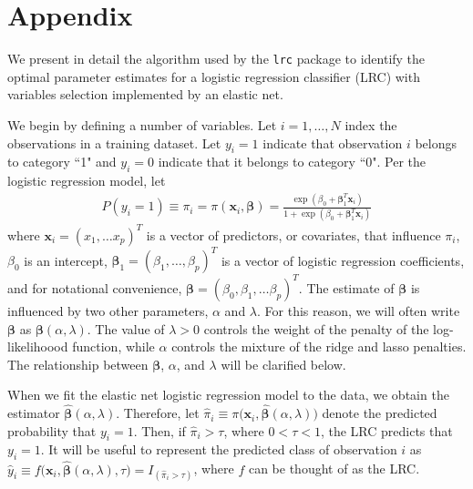 \documentclass{article}
\begin{document}
\nocite{*}

  

\newpage

\section*{Appendix}
We present in detail the algorithm used by the {\tt lrc} package to identify the optimal parameter estimates
for a logistic regression classifier (LRC) with variables selection implemented by an elastic net.  

We begin by defining a
number of variables.  Let $i = 1,\ldots,N$ index the observations in a training dataset. 
Let $y_i = 1$ indicate that observation $i$ belongs to category ``1" and $y_i = 0$ indicate
that it belongs to category ``0".  Per the logistic regression model, let  
\begin{align}
P(y_i = 1) \equiv \pi_i = \pi(\mathbf{x}_i, \boldsymbol{\beta}) = 
\frac{\exp(\beta_0 + \boldsymbol{\beta}_1^T \mathbf{x}_i)}{1+\exp(\beta_0 + \boldsymbol{\beta}_1^T \mathbf{x}_i)}
\end{align}
\noindent where $\mathbf{x}_i = (x_1, \ldots x_p)^T$ is a vector of predictors, or covariates, that
influence $\pi_i$, $\beta_0$ is an intercept, $\boldsymbol{\beta}_1 = (\beta_1, \ldots, \beta_p)^T$ is a 
vector of  logistic regression coefficients, and for notational convenience, 
$\boldsymbol{\beta} = (\beta_0, \beta_1, \ldots \beta_p)^T$. The estimate of $\boldsymbol{\beta}$ is influenced by 
two other parameters, 
$\alpha$ and $\lambda$.  For this reason, we will often write $\boldsymbol\beta$ as $\boldsymbol\beta(\alpha,\lambda)$.  
The value of $\lambda > 0$ controls the weight of the
penalty of the log-likelihoood function, while $\alpha$ controls the mixture of the ridge and lasso penalties.  
The relationship between $\boldsymbol{\beta}$, $\alpha$, and $\lambda$ will be clarified below.

When we fit the elastic net logistic regression model to the data, we obtain the estimator 
$\hat{\boldsymbol\beta}(\alpha,\lambda)$.  Therefore, 
let $\hat\pi_i \equiv \pi \bigl( \mathbf{x}_i,\hat{\boldsymbol\beta}(\alpha,\lambda) \bigr)$ denote the predicted probability 
that $y_i = 1$.  Then, if $\hat\pi_i > \tau$, where $0 < \tau < 1$, the LRC predicts 
that $y_i = 1$.  It will be useful to represent the predicted class of observation
$i$ as $\hat{y}_i \equiv f \bigl( \mathbf{x}_i,\hat{\boldsymbol{\beta}}(\alpha,\lambda),\tau \bigr) = 
I_{(\hat\pi_i > \tau)}$, where $f$ can be thought of as the LRC.
\end{document}
